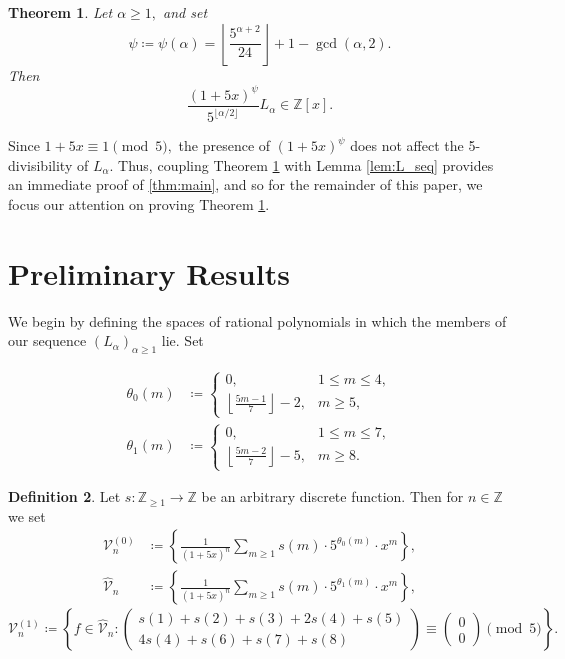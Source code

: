 \documentclass[12pt, reqno]{amsart}
\newtheorem{thm}{Theorem}[section]
\theoremstyle{definition}
\newtheorem{defn}[thm]{Definition}
\theoremstyle{remark}
\begin{document}
\begin{thm}\label{thm:main2}
Let $\alpha \geq 1,$ and set
\[\psi \coloneqq \psi(\alpha) = \left\lfloor \frac{5^{\alpha+2}}{24}\right\rfloor +1-\gcd(\alpha,2).\]
Then 
\[\frac{(1+5x)^\psi}{5^{\lfloor \alpha/2 \rfloor}} L_{\alpha} \in \mathbb{Z}[x].\]
\end{thm}
Since $1+5x \equiv 1 \pmod{5},$ the presence of $(1+5x)^\psi$ does not affect the 5-divisibility of $L_\alpha.$ Thus, coupling Theorem \ref{thm:main2} with Lemma \ref{lem:L_seq} provides an immediate proof of \ref{thm:main}, and so for the remainder of this paper, we focus our attention on proving Theorem \ref{thm:main2}. 

\section{Preliminary Results}\label{sec:prelim}
We begin by defining the spaces of rational polynomials in which the members of our sequence $(L_\alpha)_{\alpha \geq 1}$ lie. Set

\begin{align*}
\theta_0(m) &\coloneqq \begin{cases} 0, & 1 \leq m \leq 4, \\ \left\lfloor \frac{5m-1}{7} \right\rfloor -2 , & m \geq 5, \end{cases} \\
\theta_1(m) &\coloneqq \begin{cases} 0, & 1 \leq m \leq 7, \\ \left\lfloor \frac{5m-2}{7} \right\rfloor -5, & m \geq 8. \end{cases}
\end{align*}

\begin{defn} Let $s : \mathbb{Z}_{\geq 1} \rightarrow \mathbb{Z}$ be an arbitrary discrete function. Then for $n \in \mathbb{Z}$ we set 
\begin{align*}
\mathcal{V}_n^{(0)} &\coloneqq \left\{\frac{1}{(1+5x)^n} \sum\limits_{m \geq 1} s(m) \cdot 5^{\theta_0(m)} \cdot x^m \right\}, \\
\hat{\mathcal{V}}_n &\coloneqq \left\{\frac{1}{(1+5x)^n} \sum\limits_{m \geq 1} s(m) \cdot 5^{\theta_1(m)} \cdot x^m \right\}, 
\end{align*}
\begin{equation}\label{eq:Vn1}
\mathcal{V}_n^{(1)} \coloneqq \left\{f \in \hat{\mathcal{V}}_n : \begin{pmatrix} s(1) +  s(2) + s(3) + 2s(4) + s(5) \\ 4s(4) + s(6) + s(7) + s(8) \end{pmatrix} \equiv \begin{pmatrix} 0 \\ 0 \end{pmatrix} \pmod{5} \right\}.
\end{equation}
\end{defn}
\end{document}
